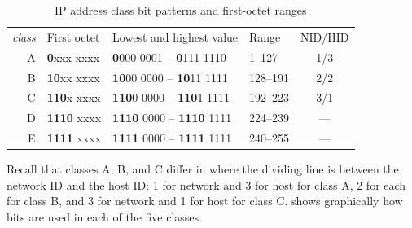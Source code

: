\begin{table}
   \centering
   \begin{tabular}{rlllc}
   \textit{class} & First octet & Lowest and highest value & Range & NID/HID \\[.75ex]
   A & \textbf{0}xxx xxxx & {\textbf{0}}000 0001 -- {\textbf{0}}111 1110 & 1--127 & 1/3   \\
   B & \textbf{10}xx xxxx & {\textbf{10}}00 0000 -- {\textbf{10}}11 1111 & 128--191 & 2/2 \\
   C & \textbf{110}x xxxx & {\textbf{110}}0 0000 -- {\textbf{110}}1 1111 & 192--223 & 3/1 \\
   D & \textbf{1110} xxxx & {\textbf{1110}} 0000 -- {\textbf{1110}} 1111 & 224--239 & --- \\
   E & \textbf{1111} xxxx & {\textbf{1111}} 0000 -- {\textbf{1111}} 1111 & 240--255 & --- \\
   \end{tabular}
   \caption{IP address class bit patterns and first-octet ranges}
   \label{tab:ip-class-bits}
\end{table}



Recall that classes A, B, and C differ in where the dividing line is between the network ID and the host ID: 1 for network and 3 for host for
class A, 2 for each for class B, and 3 for network and 1 for host for class C.
 shows graphically how bits are used in each of the five classes.


